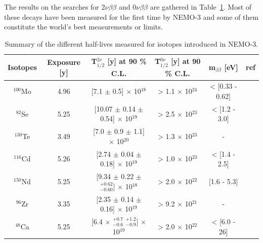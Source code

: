 \documentclass[main.tex]{subfiles}
\begin{document}
\bigskip


\NI  The results on the searches for 2$\nu\beta\beta$ and 0$\nu\beta\beta$ are gathered in Table~\ref{tab:SummaryDecayRateNEMO3}. Most of these decays have been measured for the first time by NEMO-3 and some of them constitute the world's best measurements or limits. 


\bigskip


\begin{table}[h!]
\centering
\begin{turn}{90}
\begin{tabular}{c|c|c|c|c|c}

Isotopes & Exposure [y] & T$_{\text{1/2}}^{\text{2}\nu}$ [y] at 90 \% C.L. & T$_{\text{1/2}}^{\text{0}\nu}$ [y] at 90 \% C.L. & m$_{\beta\beta}$ [eV] & ref\\

\toprule

$^{\text{100}}$Mo  & 4.96 & [7.1 $\pm$ 0.5] $\times$ 10$^{\text{18}}$ & > 1.1 $\times$ 10$^{\text{24}}$ & < [0.33 - 0.62] & \cite{NEMO3:Mo100} \\[0.1cm]

$^{\text{82}}$Se  & 5.25 & [10.07 $\pm$ 0.14 $\pm$ 0.54] $\times$ 10$^{\text{19}}$ & > 2.5 $\times$ 10$^{\text{23}}$  & < [1.2 - 3.0] &\cite{NEMO3:Se82}  \\[0.1cm]

$^{\text{130}}$Te & 3.49 &[7.0 $\pm$ 0.9 $\pm$ 1.1] $\times$ 10$^{\text{20}}$ & > 1.3 $\times$ 10$^{\text{23}}$  & - & \cite{NEMO3:Te130}\\[0.1cm]

$^{\text{116}}$Cd & 5.26 &[2.74 $\pm$ 0.04 $\pm$ 0.18] $\times$ 10$^{\text{19}}$ & > 1.0 $\times$ 10$^{\text{23}}$  & < [1.4 - 2.5] &\cite{Arnold2016bed} \\[0.1cm]

$^{\text{150}}$Nd & 5.25 &[9.34 $\pm$ 0.22 $\pm$ $^{+\text{0.62}}_{-\text{0.60}}$] $\times$ 10$^{\text{18}}$ & > 2.0 $\times$ 10$^{\text{22}}$  & [1.6 - 5.3] & \cite{NEMO3:Nd150}\\[0.1cm]

$^{\text{96}}$Zr  & 3.35 & [2.35 $\pm$ 0.14 $\pm$ 0.16] $\times$ 10$^{\text{19}}$ & > 9.2 $\times$ 10$^{\text{21}}$  & - & \cite{NEMO3:Zr96}\\[0.1cm]

$^{\text{48}}$Ca  & 5.25 &[6.4 $\times$ $^{+\text{0.7}}_{-\text{0.6}}$ $^{+\text{1.2}}_{-\text{0.9}}$] $\times$ 10$^{\text{19}}$ & > 2.0 $\times$ 10$^{\text{22}}$  & < [6.0 - 26] & \cite{NEMO3:Ca48}\\[0.1cm]

\bottomrule
\end{tabular}
\end{turn}
\caption{Summary of the different half-lives measured for isotopes introduced in NEMO-3.}
\label{tab:SummaryDecayRateNEMO3}
\end{table}
\end{document}
